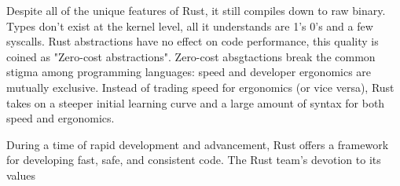 \documentclass[12pt]{article}
\begin{document}

Despite all of the unique features of Rust, it still compiles down to raw
binary. Types don't exist at the kernel level, all it understands are 1's 0's
and a few syscalls. Rust abstractions have no effect on code performance, this
quality is coined as "Zero-cost abstractions". Zero-cost absgtactions break the
common stigma among programming languages: speed and developer ergonomics are
mutually exclusive. Instead of trading speed for ergonomics (or vice versa),
Rust takes on a steeper initial learning curve and a large amount of syntax for
both speed and ergonomics.


During a time of rapid development and advancement, Rust offers a framework for
developing fast, safe, and consistent code. The Rust team's devotion to its
values

\makeworkscited{}
\end{document}
